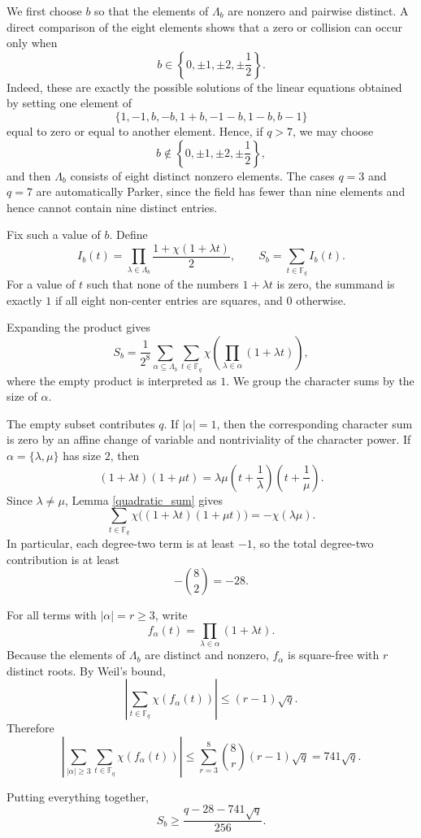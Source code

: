 \documentclass{article}
\newcommand{\F}{\mathbb F}
\theoremstyle{definition}
\numberwithin{equation}{section}
\begin{document}
We first choose \(b\) so that the elements of \(\Lambda_b\) are nonzero and
pairwise distinct.  A direct comparison of the eight elements shows that a zero
or collision can occur only when
\[
b\in\left\{0,\pm1,\pm2,\pm\frac12\right\}.
\]
Indeed, these are exactly the possible solutions of the linear equations
obtained by setting one element of
\[
\{1,-1,b,-b,1+b,-1-b,1-b,b-1\}
\]
equal to zero or equal to another element.  Hence, if \(q>7\), we may choose
\[
b\notin\left\{0,\pm1,\pm2,\pm\frac12\right\},
\]
and then \(\Lambda_b\) consists of eight distinct nonzero elements.  The cases
\(q=3\) and \(q=7\) are automatically Parker, since the field has fewer than
nine elements and hence cannot contain nine distinct entries.

Fix such a value of \(b\).  Define
\[
I_b(t)=
\prod_{\lambda\in\Lambda_b}
\frac{1+\chi(1+\lambda t)}{2},
\qquad
S_b=\sum_{t\in\F_q} I_b(t).
\]
For a value of \(t\) such that none of the numbers \(1+\lambda t\) is zero, the
summand is exactly \(1\) if all eight non-center entries are squares, and \(0\)
otherwise.

Expanding the product gives
\[
S_b=\frac{1}{2^8}
\sum_{\alpha\subseteq \Lambda_b}
\sum_{t\in\F_q}
\chi\!\left(\prod_{\lambda\in\alpha}(1+\lambda t)\right),
\]
where the empty product is interpreted as \(1\).  We group the character sums by
the size of \(\alpha\).

The empty subset contributes \(q\).  If \(|\alpha|=1\), then the corresponding
character sum is zero by an affine change of variable and nontriviality of the character power.  If \(\alpha=\{\lambda,\mu\}\) has size \(2\), then
\[
(1+\lambda t)(1+\mu t)
=
\lambda\mu
\left(t+\frac1\lambda\right)
\left(t+\frac1\mu\right).
\]
Since \(\lambda\neq\mu\), Lemma \ref{quadratic_sum} gives
\[
\sum_{t\in\F_q}\chi\bigl((1+\lambda t)(1+\mu t)\bigr)
=
-\chi(\lambda\mu).
\]
In particular, each degree-two term is at least \(-1\), so the total
degree-two contribution is at least
\[
-\binom82=-28.
\]

For all terms with \(|\alpha|=r\geq3\), write
\[
f_\alpha(t)=\prod_{\lambda\in\alpha}(1+\lambda t).
\]
Because the elements of \(\Lambda_b\) are distinct and nonzero, \(f_\alpha\) is
square-free with \(r\) distinct roots.  By Weil's bound,
\[
\left|
\sum_{t\in\F_q}
\chi(f_\alpha(t))
\right|
\leq (r-1)\sqrt q.
\]
Therefore
\[
\left|
\sum_{|\alpha|\geq3}
\sum_{t\in\F_q}
\chi(f_\alpha(t))
\right|
\leq
\sum_{r=3}^8 \binom8r(r-1)\sqrt q
=
741\sqrt q.
\]

Putting everything together,
\[
S_b
\geq
\frac{q-28-741\sqrt q}{256}.
\]
\end{document}
